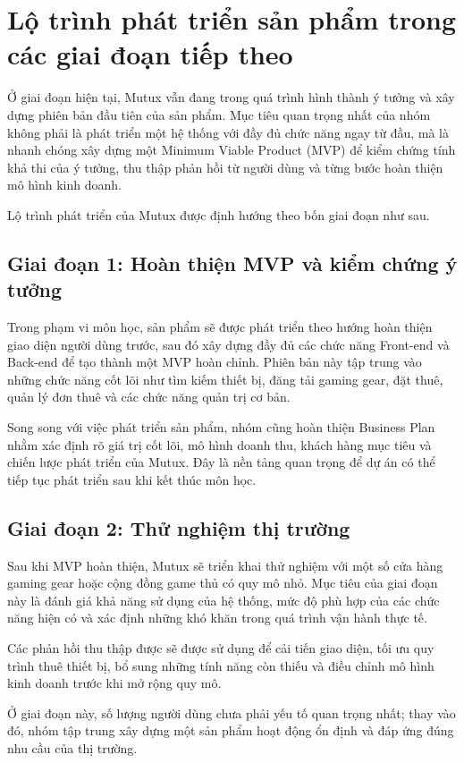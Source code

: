 \section{Lộ trình phát triển sản phẩm trong các giai đoạn tiếp theo}
Ở giai đoạn hiện tại, Mutux vẫn đang trong quá trình hình thành ý tưởng và xây dựng phiên bản đầu tiên của sản phẩm. Mục tiêu quan trọng nhất của nhóm không phải là phát triển một hệ thống với đầy đủ chức năng ngay từ đầu, mà là nhanh chóng xây dựng một Minimum Viable Product (MVP) để kiểm chứng tính khả thi của ý tưởng, thu thập phản hồi từ người dùng và từng bước hoàn thiện mô hình kinh doanh.

Lộ trình phát triển của Mutux được định hướng theo bốn giai đoạn như sau.

\subsection{Giai đoạn 1: Hoàn thiện MVP và kiểm chứng ý tưởng}
Trong phạm vi môn học, sản phẩm sẽ được phát triển theo hướng hoàn thiện giao diện người dùng trước, sau đó xây dựng đầy đủ các chức năng Front-end và Back-end để tạo thành một MVP hoàn chỉnh. Phiên bản này tập trung vào những chức năng cốt lõi như tìm kiếm thiết bị, đăng tải gaming gear, đặt thuê, quản lý đơn thuê và các chức năng quản trị cơ bản.

Song song với việc phát triển sản phẩm, nhóm cũng hoàn thiện Business Plan nhằm xác định rõ giá trị cốt lõi, mô hình doanh thu, khách hàng mục tiêu và chiến lược phát triển của Mutux. Đây là nền tảng quan trọng để dự án có thể tiếp tục phát triển sau khi kết thúc môn học.

\subsection{Giai đoạn 2: Thử nghiệm thị trường}
Sau khi MVP hoàn thiện, Mutux sẽ triển khai thử nghiệm với một số cửa hàng gaming gear hoặc cộng đồng game thủ có quy mô nhỏ. Mục tiêu của giai đoạn này là đánh giá khả năng sử dụng của hệ thống, mức độ phù hợp của các chức năng hiện có và xác định những khó khăn trong quá trình vận hành thực tế.

Các phản hồi thu thập được sẽ được sử dụng để cải tiến giao diện, tối ưu quy trình thuê thiết bị, bổ sung những tính năng còn thiếu và điều chỉnh mô hình kinh doanh trước khi mở rộng quy mô.

Ở giai đoạn này, số lượng người dùng chưa phải yếu tố quan trọng nhất; thay vào đó, nhóm tập trung xây dựng một sản phẩm hoạt động ổn định và đáp ứng đúng nhu cầu của thị trường.


